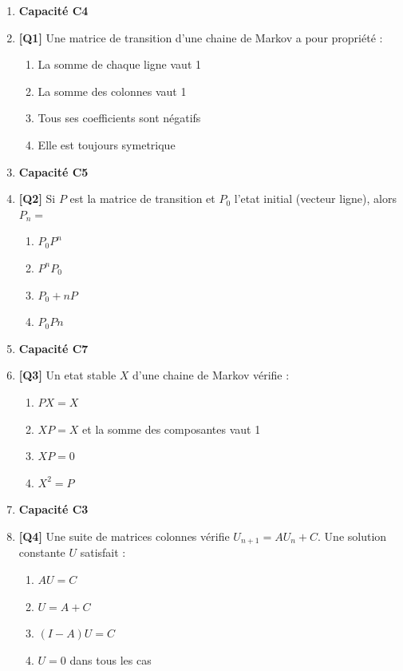\begin{enumerate}

\item[] \textbf{Capacité C4}

\item \textbf{[Q1]} Une matrice de transition d'une chaine de Markov a pour propriété :
  \begin{enumerate}[label=\Alph*.]
    \item La somme de chaque ligne vaut 1
    \item La somme des colonnes vaut 1
    \item Tous ses coefficients sont négatifs
    \item Elle est toujours symetrique
  \end{enumerate}

\item[] \textbf{Capacité C5}

\item \textbf{[Q2]} Si $P$ est la matrice de transition et $P_0$ l'etat initial (vecteur ligne), alors $P_n =$
  \begin{enumerate}[label=\Alph*.]
    \item $P_0 P^n$
    \item $P^n P_0$
    \item $P_0 + n P$
    \item $P_0 P n$
  \end{enumerate}

\item[] \textbf{Capacité C7}

\item \textbf{[Q3]} Un etat stable $X$ d'une chaine de Markov vérifie :
  \begin{enumerate}[label=\Alph*.]
    \item $P X = X$
    \item $X P = X$ et la somme des composantes vaut 1
    \item $X P = 0$
    \item $X^2 = P$
  \end{enumerate}

\item[] \textbf{Capacité C3}

\item \textbf{[Q4]} Une suite de matrices colonnes vérifie $U_{n+1}=AU_n+C$. Une solution constante $U$ satisfait :
  \begin{enumerate}[label=\Alph*.]
    \item $AU=C$
    \item $U=A+C$
    \item $(I-A)U=C$
    \item $U=0$ dans tous les cas
  \end{enumerate}


\end{enumerate}
